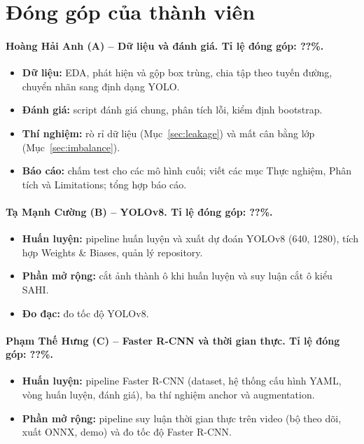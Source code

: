 
\section*{Đóng góp của thành viên}
\label{sec:contributions}

\paragraph{Hoàng Hải Anh (A) -- Dữ liệu và đánh giá. Tỉ lệ đóng góp: ??\%.}
\begin{itemize}
\item \textbf{Dữ liệu:} EDA, phát hiện và gộp box trùng, chia tập theo tuyến đường, chuyển nhãn sang định dạng YOLO.
\item \textbf{Đánh giá:} script đánh giá chung, phân tích lỗi, kiểm định bootstrap.
\item \textbf{Thí nghiệm:} rò rỉ dữ liệu (Mục~\ref{sec:leakage}) và mất cân bằng lớp (Mục~\ref{sec:imbalance}).
\item \textbf{Báo cáo:} chấm test cho các mô hình cuối; viết các mục Thực nghiệm, Phân tích và Limitations; tổng hợp báo cáo.
\end{itemize}

\paragraph{Tạ Mạnh Cường (B) -- YOLOv8. Tỉ lệ đóng góp: ??\%.}
\begin{itemize}
\item \textbf{Huấn luyện:} pipeline huấn luyện và xuất dự đoán YOLOv8 (640, 1280), tích hợp Weights \& Biases, quản lý repository.
\item \textbf{Phần mở rộng:} cắt ảnh thành ô khi huấn luyện và suy luận cắt ô kiểu SAHI.
\item \textbf{Đo đạc:} đo tốc độ YOLOv8.
\end{itemize}

\paragraph{Phạm Thế Hưng (C) -- Faster R-CNN và thời gian thực. Tỉ lệ đóng góp: ??\%.}
\begin{itemize}
\item \textbf{Huấn luyện:} pipeline Faster R-CNN (dataset, hệ thống cấu hình YAML, vòng huấn luyện, đánh giá), ba thí nghiệm anchor và augmentation.
\item \textbf{Phần mở rộng:} pipeline suy luận thời gian thực trên video (bộ theo dõi, xuất ONNX, demo) và đo tốc độ Faster R-CNN.
\end{itemize}
